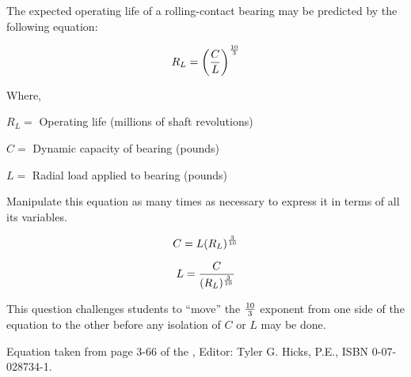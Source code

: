 

The expected operating life of a rolling-contact bearing may be predicted by the following equation:

$$R_L = \biggl( {C \over L} \biggr)^{10 \over 3}$$

\noindent
Where,

$R_L =$ Operating life (millions of shaft revolutions)

$C =$ Dynamic capacity of bearing (pounds)

$L =$ Radial load applied to bearing (pounds)

\vskip 10pt

Manipulate this equation as many times as necessary to express it in terms of all its variables.







$$C = L(R_L)^{3 \over 10}$$

$$L = {C \over (R_L)^{3 \over 10}}$$







This question challenges students to ``move'' the ${10 \over 3}$ exponent from one side of the equation to the other before any isolation of $C$ or $L$ may be done.

\vskip 10pt

Equation taken from page 3-66 of the , Editor: Tyler G. Hicks, P.E., ISBN 0-07-028734-1.




